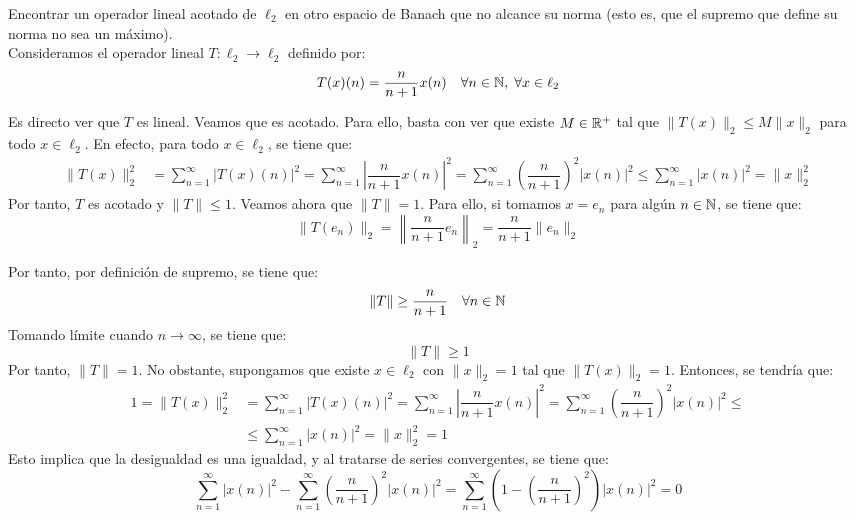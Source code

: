 \begin{ejercicio}
Encontrar un operador lineal acotado de $\ell_2$ en otro espacio de Banach que no alcance su norma (esto es, que el supremo que define su norma no sea un máximo).\\

Consideramos el operador lineal $T: \ell_2 \longrightarrow \ell_2$ definido por:
    \begin{equation*}
        T(x)(n) = \dfrac{n}{n+1} x(n) \quad \forall n \in \mathbb{N}, \; \forall x \in \ell_2
    \end{equation*}

    Es directo ver que $T$ es lineal. Veamos que es acotado. Para ello, basta con ver que existe $M \in \mathbb{R}^+$ tal que $\|T(x)\|_2 \leq M \|x\|_2$ para todo $x \in \ell_2$. En efecto, para todo $x \in \ell_2$, se tiene que:
    \begin{align*}
        \|T(x)\|_2^2 &= \sum_{n=1}^{\infty} |T(x)(n)|^2 = \sum_{n=1}^{\infty} \left|\dfrac{n}{n+1} x(n)\right|^2 = \sum_{n=1}^{\infty} \left(\dfrac{n}{n+1}\right)^2 |x(n)|^2 \leq \sum_{n=1}^{\infty} |x(n)|^2 = \|x\|_2^2
    \end{align*}
    Por tanto, $T$ es acotado y $\|T\| \leq 1$. Veamos ahora que $\|T\| = 1$. Para ello, si tomamos $x=e_n$ para algún $n \in \mathbb{N}$, se tiene que:
    \begin{equation*}
        \|T(e_n)\|_2 = \left\|\dfrac{n}{n+1} e_n\right\|_2 = \dfrac{n}{n+1} \|e_n\|_2
    \end{equation*}

    Por tanto, por definición de supremo, se tiene que:
    \begin{equation*}
        \|T\|\geq \dfrac{n}{n+1} \quad \forall n \in \mathbb{N}
    \end{equation*}
    Tomando límite cuando $n \to \infty$, se tiene que:
    \begin{equation*}
        \|T\| \geq 1
    \end{equation*}
    Por tanto, $\|T\| = 1$. No obstante, supongamos que existe $x \in \ell_2$ con $\|x\|_2 = 1$ tal que $\|T(x)\|_2 = 1$. Entonces, se tendría que:
    \begin{align*}
        1 = \|T(x)\|_2^2 &= \sum_{n=1}^{\infty} |T(x)(n)|^2 = \sum_{n=1}^{\infty} \left|\dfrac{n}{n+1} x(n)\right|^2 = \sum_{n=1}^{\infty} \left(\dfrac{n}{n+1}\right)^2 |x(n)|^2 
        \leq\\&\leq
        \sum_{n=1}^{\infty} |x(n)|^2 = \|x\|_2^2 = 1
    \end{align*}
    Esto implica que la desigualdad es una igualdad, y al tratarse de series convergentes, se tiene que:
    \begin{equation*}
        \sum_{n=1}^{\infty} |x(n)|^2 - \sum_{n=1}^{\infty} \left(\dfrac{n}{n+1}\right)^2 |x(n)|^2 = \sum_{n=1}^{\infty} \left(1 - \left(\dfrac{n}{n+1}\right)^2\right) |x(n)|^2 = 0
    \end{equation*}


\end{ejercicio}
